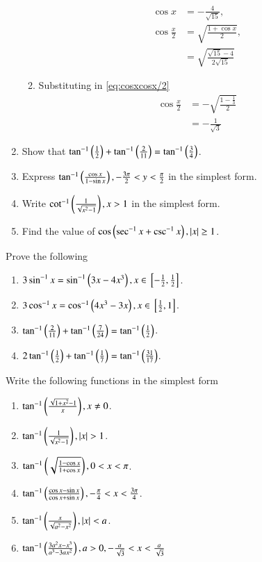 \begin{enumerate}[label=\thesubsection.\arabic*,ref=\thesubsection.\theenumi,itemsep=1ex]
\begin{enumerate}
\begin{align}
	\cos x &= -\frac{4}{\sqrt{15}},
	\\
	\cos \frac{x}{2} &= \sqrt{\frac{1+\cos x}{2}},
	\label{eq:cosxcosx/2}
	\\
	&= \sqrt{\frac{\sqrt{15}-4}{2{\sqrt{15}}}}
\end{align}
\item 
	Substituting in \eqref{eq:cosxcosx/2}
\begin{align}
	\cos \frac{x}{2} &= -\sqrt{\frac{1-\frac{1}{3}}{2}}
	\\
	&=-\frac{1}{\sqrt{3}}
\end{align}
\end{enumerate}
	\item Show that $\tan^{-1}\left(\frac{1}{2}\right)+\tan^{-1}\left(\frac{2}{11}\right)=\tan^{-1}\left(\frac{3}{4}\right)$.
	\item Express 
		$\tan^{-1}\left(\frac{\cos x}{1-\sin x}\right),
-\frac{3\pi}{2} < y < \frac{\pi}{2}$
		in the simplest form.
	\item Write
		$\cot^{-1}\left(\frac{1}{\sqrt{x^2-1}}\right),
x > 1$
		in the simplest form.
	\item Find the value of
		$\cos\left(\sec^{-1}x +\csc^{-1}x\right),
		\left\vert x\right\vert \ge 1$.
\end{enumerate}
Prove the following
\begin{enumerate}[label=\thesubsection.\arabic*,ref=\thesubsection.\theenumi,resume*,itemsep=1ex]
	\item 
		$3\sin^{-1}x =\sin^{-1}\left(3x-4x^3\right),
		x \in {}\left[-\frac{1}{2},\frac{1}{2}\right]$.
	\item 
		$3\cos^{-1}x =\cos^{-1}\left(4x^3-3x\right),
		x \in {}\left[\frac{1}{2},{1}\right]$.
	\item $\tan^{-1}\left(\frac{2}{11}\right)+\tan^{-1}\left(\frac{7}{24}\right)=\tan^{-1}\left(\frac{1}{2}\right)$.
	\item $2\tan^{-1}\left(\frac{1}{2}\right)+\tan^{-1}\left(\frac{1}{7}\right)=\tan^{-1}\left(\frac{31}{17}\right)$.
\end{enumerate}
Write the following functions in the simplest form
\begin{enumerate}[label=\thesubsection.\arabic*,ref=\thesubsection.\theenumi,resume*,itemsep=1ex]
	\item 
		$\tan^{-1}\left(\frac{\sqrt{1+x^2}-1}{x}\right),
x \ne 0$.
	\item 
		$\tan^{-1}\left(\frac{1}{\sqrt{x^2-1}}\right),
		\left\vert x\right\vert > 1$.
	\item 
		$\tan^{-1}\left(\sqrt{\frac{1-\cos x}{1+\cos x}}\right),
		0 < {x} < \pi$.
	\item 
		$\tan^{-1}\left(\frac{\cos x-\sin x}{\cos x+\sin x}\right),
-\frac{\pi}{4} < x < \frac{3\pi}{4}$.
	\item 
		$\tan^{-1}\left(\frac{x}{\sqrt{a^2-x^2}}\right),
		\left\vert x\right\vert < a$.
	\item 
		$\tan^{-1}\left(\frac{3a^2x-x^3}{{a^3-3ax^2}}\right),
		a > 0,
		-\frac{a}{\sqrt{3}} < x < \frac{a}{\sqrt{3}}$
\end{enumerate}
